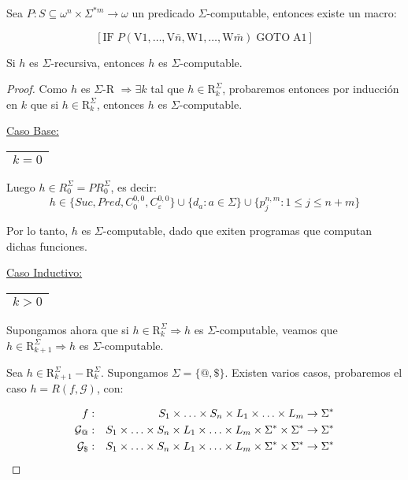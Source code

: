  \begin{proposition}
    \PN Sea $P: S \subseteq \omega^{n} \times \Sigma^{\ast m} \rightarrow \omega$ un predicado $\Sigma$-computable,
    entonces existe un macro:

    \[
      \left[\mathrm{IF} \; P(\mathrm{V}1,\dotsc,\mathrm{V}\bar{n},\mathrm{W}1,\dotsc,\mathrm{W}\bar{m}) \; \mathrm{GOTO}
      \; \mathrm{A}1\right]
    \]
  \end{proposition}

  \begin{theorem}
    \PN Si $h$ es $\Sigma$-recursiva, entonces $h$ es $\Sigma$-computable.
  \end{theorem}
  \begin{proof}
    \PN Como $h$ es $\Sigma$-R $\Rightarrow \exists k$ tal que $h \in \mathrm{R}_{k}^{\Sigma}$, probaremos entonces por
    inducción en $k$ que si $h \in \mathrm{R}_{k}^{\Sigma}$, entonces $h$ es $\Sigma$-computable.

    \vspace{3mm}
    \PN \underline{Caso Base:} \begin{tabular}{|c|} \hline $k = 0$ \\\hline \end{tabular}

    \PN Luego $h \in R_{0}^{\Sigma} = PR_{0}^{\Sigma}$, es decir:
    \[
      h \in \{Suc, Pred, C_{0}^{0,0}, C_{\varepsilon}^{0,0}\} \cup \{d_{a}: a \in \Sigma\} \cup \{p_{j}^{n,m} : 1 \leq j
      \leq n+m\}
    \]

    \PN Por lo tanto, $h$ es $\Sigma$-computable, dado que exiten programas que computan dichas funciones.

    \vspace{3mm}
		\PN \underline{Caso Inductivo:} \begin{tabular}{|c|} \hline $k > 0$ \\\hline \end{tabular}

    \PN Supongamos ahora que si $h \in \mathrm{R}_{k}^{\Sigma} \Rightarrow h$ es $\Sigma$-computable, veamos que $h \in
    \mathrm{R}_{k+1}^{\Sigma} \Rightarrow h$ es $\Sigma$-computable.

    \PN Sea $h \in \mathrm{R}_{k+1}^{\Sigma} - \mathrm{R}_{k}^{\Sigma}$. Supongamos $\Sigma = \{@, \$\}$. Existen varios
    casos, probaremos el caso $h=R(f,\mathcal{G})$, con:

    \begin{eqnarray*}
      f &:& S_{1 }\times \dotsc \times S_{n} \times L_{1} \times \dotsc \times L_{m} \rightarrow \Sigma^{\ast} \\
      \mathcal{G}_{@} &:& S_{1} \times \dotsc \times S_{n} \times L_{1} \times \dotsc \times L_{m} \times \Sigma^{\ast} \times
        \Sigma^{\ast} \rightarrow \Sigma^{\ast} \\
      \mathcal{G}_{\$} &:& S_{1} \times \dotsc \times S_{n} \times L_{1} \times \dotsc \times L_{m} \times \Sigma^{\ast} \times
        \Sigma^{\ast} \rightarrow \Sigma^{\ast}
    \end{eqnarray*}


\end{proof}

